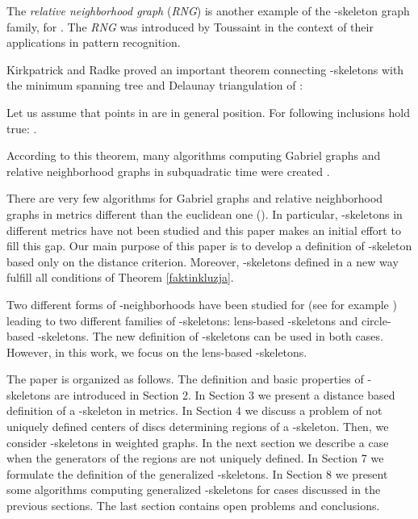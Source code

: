 \documentclass[11pt]{llncs}
\begin{document}
The {\em relative neighborhood graph} (\textit{RNG}) is  another example of the -skeleton
graph family, for . The \textit{RNG} was 
introduced by Toussaint \cite{tou80} in the context of their applications in pattern 
recognition. 

Kirkpatrick and Radke \cite{kr85} proved an important theorem connecting -skeletons 
with the minimum spanning tree  and Delaunay triangulation  of  :

\begin{theorem}
\label{faktinkluzja}
Let us assume that points in  are in general position.
For  following inclusions hold true: 
.
\end{theorem}

According to this theorem, many algorithms computing Gabriel graphs and relative neighborhood graphs
in subquadratic time were created \cite{ms84,su83,jk87,jky89,l94}.

There are very few algorithms for Gabriel graphs and relative neighborhood graphs
in metrics different than the euclidean one (\cite{mg11,w06}). In particular, -skeletons 
in different metrics have not been studied and this paper makes an initial effort to fill this gap.
Our main purpose of this paper is to develop a definition of -skeleton based 
only on the distance criterion.
Moreover, -skeletons defined in a new way fulfill all conditions of Theorem \ref{faktinkluzja}.

Two different forms of -neighborhoods have been studied for 
(see for example  \cite{abe98,e02})   
leading to two different families of -skeletons: lens-based -skeletons 
and circle-based -skeletons. 
The new definition of -skeletons can be used in both cases. 
However, in this work, we focus on the lens-based -skeletons.   

  










The paper is organized as follows.
The definition and basic properties of -skeletons are introduced in Section 2. 
In Section 3 we present a distance based definition of a -skeleton in  metrics. 
In Section 4 we discuss 
a problem of not uniquely defined centers of discs determining regions of a -skeleton. 
Then, we consider -skeletons in weighted graphs. In the next section we describe a case 
when the generators of the regions are not uniquely defined. In Section 7 we formulate 
the definition of the generalized -skeletons. In Section 8 we present some algorithms 
computing generalized -skeletons for cases discussed in the previous sections. 
The last section contains open problems and conclusions.
\end{document}
